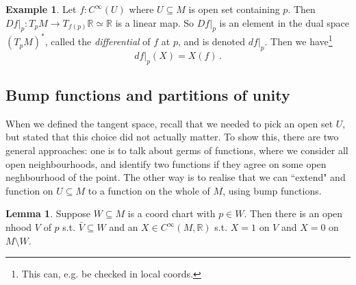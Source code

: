 \documentclass[a4paper,11pt]{article}
\theoremstyle{definition}
\newtheorem*{ex}{Example}
\newtheorem*{lem}{Lemma}
\numberwithin{equation}{section}
\begin{document}
\begin{ex}
Let $f:C^\infty(U)$ where $U\subseteq M$ is open set containing $p$. Then $Df|_p:T_pM\rightarrow T_{f(p)}\mathbb{R}\simeq\mathbb{R}$ is a linear map. So $Df|_p$ is an element in the dual space $(T_pM)^*$, called the \emph{differential} of $f$ at $p$, and is denoted $df|_p$. Then we have\footnote{This can, e.g. be checked in local coords.}
\[
df|_p(X)=X(f)\,.
\]
\end{ex}

\subsection{Bump functions and partitions of unity}
When we defined the tangent space, recall that we needed to pick an open set $U$, but stated that this choice did not actually matter. To show this, there are two general approaches: one is to talk about germs of functions, where we consider all open neighbourhoods, and identify two functions if they agree on some open neghbourhood of the point. The other way is to realise that we can ``extend" and function on $U\subseteq M$ to a function on the whole of $M$, using bump functions.

\begin{lem}
Suppose $W\subseteq M$ is a coord chart with $p\in W$. Then there is an open nhood $V$ of $p$ s.t. $\bar{V}\subseteq W$ and an $X\in C^\infty(M,\mathbb{R})$ s.t. $X=1$ on $V$ and $X=0$ on $M\setminus W$.
\end{lem}
\end{document}
